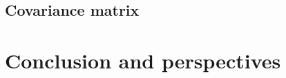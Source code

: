 \documentclass[../main.tex]{subfiles}
\begin{document}
\subsection{Covariance matrix}
\label{sec:joint_fit:cov_mat}

%
%
%
%
%

\section{Conclusion and perspectives}
\label{sec:joint_fit:conclusion}
\end{document}
